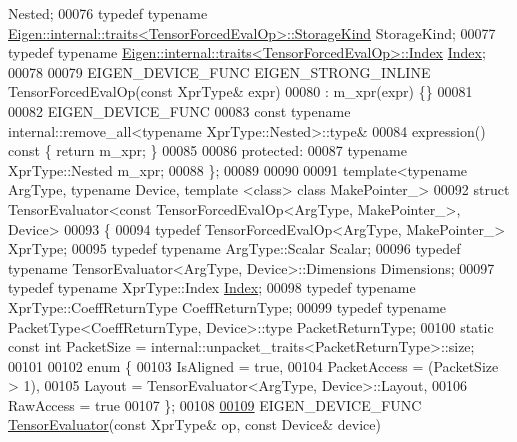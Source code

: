 \begin{DoxyCode}
       Nested;
00076   \textcolor{keyword}{typedef} \textcolor{keyword}{typename} \hyperlink{struct_eigen_1_1internal_1_1traits}{Eigen::internal::traits<TensorForcedEvalOp>::StorageKind}
       StorageKind;
00077   \textcolor{keyword}{typedef} \textcolor{keyword}{typename} \hyperlink{struct_eigen_1_1internal_1_1traits}{Eigen::internal::traits<TensorForcedEvalOp>::Index}
       \hyperlink{namespace_eigen_a62e77e0933482dafde8fe197d9a2cfde}{Index};
00078 
00079   EIGEN\_DEVICE\_FUNC EIGEN\_STRONG\_INLINE TensorForcedEvalOp(\textcolor{keyword}{const} XprType& expr)
00080       : m\_xpr(expr) \{\}
00081 
00082     EIGEN\_DEVICE\_FUNC
00083     \textcolor{keyword}{const} \textcolor{keyword}{typename} internal::remove\_all<typename XprType::Nested>::type&
00084     expression()\textcolor{keyword}{ const }\{ \textcolor{keywordflow}{return} m\_xpr; \}
00085 
00086   \textcolor{keyword}{protected}:
00087     \textcolor{keyword}{typename} XprType::Nested m\_xpr;
00088 \};
00089 
00090 
00091 \textcolor{keyword}{template}<\textcolor{keyword}{typename} ArgType, \textcolor{keyword}{typename} Device, \textcolor{keyword}{template} <\textcolor{keyword}{class}> \textcolor{keyword}{class }MakePointer\_>
00092 \textcolor{keyword}{struct }TensorEvaluator<const TensorForcedEvalOp<ArgType, MakePointer\_>, Device>
00093 \{
00094   \textcolor{keyword}{typedef} TensorForcedEvalOp<ArgType, MakePointer\_> XprType;
00095   \textcolor{keyword}{typedef} \textcolor{keyword}{typename} ArgType::Scalar Scalar;
00096   \textcolor{keyword}{typedef} \textcolor{keyword}{typename} TensorEvaluator<ArgType, Device>::Dimensions Dimensions;
00097   \textcolor{keyword}{typedef} \textcolor{keyword}{typename} XprType::Index \hyperlink{namespace_eigen_a62e77e0933482dafde8fe197d9a2cfde}{Index};
00098   \textcolor{keyword}{typedef} \textcolor{keyword}{typename} XprType::CoeffReturnType CoeffReturnType;
00099   \textcolor{keyword}{typedef} \textcolor{keyword}{typename} PacketType<CoeffReturnType, Device>::type PacketReturnType;
00100   \textcolor{keyword}{static} \textcolor{keyword}{const} \textcolor{keywordtype}{int} PacketSize = internal::unpacket\_traits<PacketReturnType>::size;
00101 
00102   \textcolor{keyword}{enum} \{
00103     IsAligned = \textcolor{keyword}{true},
00104     PacketAccess = (PacketSize > 1),
00105     Layout = TensorEvaluator<ArgType, Device>::Layout,
00106     RawAccess = \textcolor{keyword}{true}
00107   \};
00108 
\hyperlink{struct_eigen_1_1_tensor_evaluator_3_01const_01_tensor_forced_eval_op_3_01_arg_type_00_01_make_pointer___01_4_00_01_device_01_4_aad4c3dfe2a278cd7c75fa1848153d53e}{00109}   EIGEN\_DEVICE\_FUNC \hyperlink{struct_eigen_1_1_tensor_evaluator_3_01const_01_tensor_forced_eval_op_3_01_arg_type_00_01_make_pointer___01_4_00_01_device_01_4_aad4c3dfe2a278cd7c75fa1848153d53e}{TensorEvaluator}(\textcolor{keyword}{const} XprType& op, \textcolor{keyword}{const} Device& device)

\end{DoxyCode}
